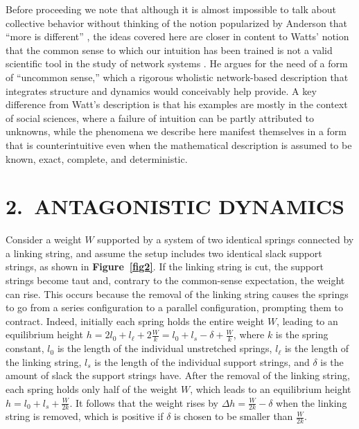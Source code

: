 \documentclass[
preprint,
superscriptaddress,
aps,
prl,
]{revtex4-1}
\begin{document}
Before proceeding we note that although it is almost impossible to talk about collective behavior without thinking of the 
  {\color{black} notion}
popularized by Anderson that ``more is different'' \cite{anderson1972more}, the ideas covered here are closer in content to 
  {\color{black} Watts'}
notion that the common sense to which our intuition has been trained is not a valid scientific tool in the study of network systems \cite{watts2011everything}. He argues for the need of a form of ``uncommon sense,'' which a rigorous wholistic  network-based description that integrates structure and dynamics would conceivably help provide. A key difference from Watt's description is that 
his examples are mostly in the context of social sciences, where 
a failure of intuition can be partly attributed to unknowns, while 
the phenomena we describe here manifest themselves in a form that is counterintuitive even when the mathematical description is assumed to be known, exact, complete, and deterministic. 



\section{2.~ANTAGONISTIC DYNAMICS}


Consider a weight $W$ supported by a system of two
{\color{black} identical}
 springs connected by a linking string, and assume the setup includes two {\color{black} identical} slack support strings, as shown in  \textbf{Figure~\ref{fig2}}.
If the linking string is cut, the support strings become taut and, contrary to the common-sense expectation, the weight can rise.  This occurs because the removal of the linking string causes the springs to go from a series configuration to a parallel configuration, prompting them to contract. Indeed, initially each spring holds the entire weight $W$, leading to an equilibrium height 
{\color{black} 
$h= 2l_0+l_\ell+2 \frac{W}{k}
= l_0 + l_s-\delta+\frac{W}{k}$,} where $k$ is the spring constant,  $l_0$ is the length of {\color{black}  the individual} unstretched springs,   
{\color{black} $l_\ell$ is the length of the linking string,
$l_s$ is the length of the individual} support strings, 
and $\delta$ is the amount of slack the {\color{black} support} strings have.
{\color{black} After}
the removal of the linking string, each spring holds only half of the weight $W$, which leads to an equilibrium height 
{\color{black} $h=l_0 + l_s+\frac{W}{2k}$.} It follows that the weight rises by $\Delta{}h=\frac{W}{2k}-\delta$ when the linking string is removed, which is positive if $\delta$ is chosen to be smaller than $\frac{W}{2k}$. 
\end{document}
